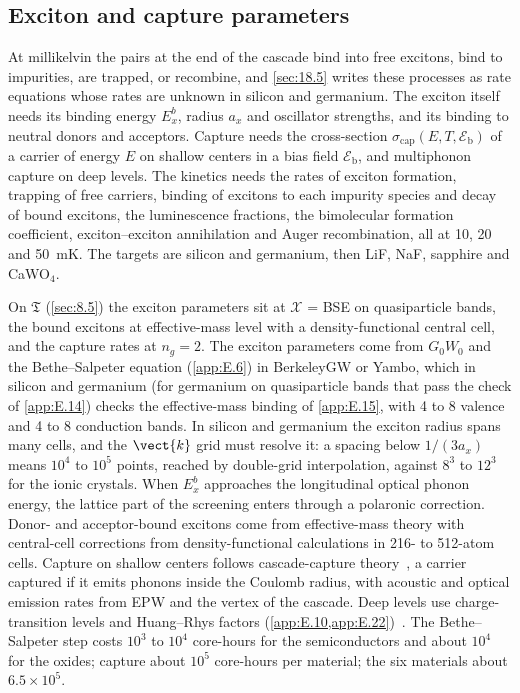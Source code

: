 \subsection{Exciton and capture parameters}

At millikelvin the pairs at the end of the cascade bind into free excitons, bind to impurities, are trapped, or recombine, and \cref{sec:18.5} writes these processes as rate equations whose rates are unknown in silicon and germanium. The exciton itself needs its binding energy $E_x^b$, radius $a_x$ and oscillator strengths, and its binding to neutral donors and acceptors. Capture needs the cross-section $\sigma_{\mathrm{cap}}(E, T, \mathcal{E}_{\mathrm{b}})$ of a carrier of energy $E$ on shallow centers in a bias field $\mathcal{E}_{\mathrm{b}}$, and multiphonon capture on deep levels. The kinetics needs the rates of exciton formation, trapping of free carriers, binding of excitons to each impurity species and decay of bound excitons, the luminescence fractions, the bimolecular formation coefficient, exciton--exciton annihilation and Auger recombination, all at 10, 20 and \SI{50}{mK}. The targets are silicon and germanium, then LiF, NaF, sapphire and CaWO$_4$.

On $\mathfrak{T}$ (\cref{sec:8.5}) the exciton parameters sit at $\mathcal{X}$ = BSE on quasiparticle bands, the bound excitons at effective-mass level with a density-functional central cell, and the capture rates at $n_g = 2$. The exciton parameters come from $G_0W_0$ and the Bethe--Salpeter equation (\cref{app:E.6}) in BerkeleyGW or Yambo, which in silicon and germanium (for germanium on quasiparticle bands that pass the check of \cref{app:E.14}) checks the effective-mass binding of \cref{app:E.15}, with 4 to 8 valence and 4 to 8 conduction bands. In silicon and germanium the exciton radius spans many cells, and the $\vect{k}$ grid must resolve it: a spacing below $1/(3a_x)$ means $10^4$ to $10^5$ points, reached by double-grid interpolation, against $8^3$ to $12^3$ for the ionic crystals. When $E_x^b$ approaches the longitudinal optical phonon energy, the lattice part of the screening enters through a polaronic correction. Donor- and acceptor-bound excitons come from effective-mass theory with central-cell corrections from density-functional calculations in 216- to 512-atom cells. Capture on shallow centers follows cascade-capture theory~\cite{lax1960cascade}, a carrier captured if it emits phonons inside the Coulomb radius, with acoustic and optical emission rates from EPW and the vertex of the cascade. Deep levels use charge-transition levels and Huang--Rhys factors (\cref{app:E.10,app:E.22})~\cite{alkauskas2014first}. The Bethe--Salpeter step costs $10^3$ to $10^4$ core-hours for the semiconductors and about $10^4$ for the oxides; capture about $10^5$ core-hours per material; the six materials about $6.5\times10^5$.

